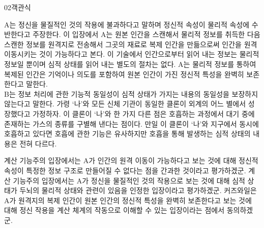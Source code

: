 \documentclass[fs85,seriesWit]{korfarm-base}
\begin{document}
\begin{kfQBlock}{02}{객관식}
\begin{kfEvidence}A는 정신을 물질적인 것의 작용에 불과하다고 말하며 정신적 속성이 물리적 속성에 수반한다고 주장한다. 이 입장에서 A는 원본 인간을 스캔해서 물리적 정보를 취득한 다음 스캔한 정보를 원격지로 전송해서 그곳의 재료로 복제 인간을 만듦으로써 인간을 원격 이동시키는 것이 가능하다고 본다. 이 기술에서 인간으로부터 읽어 내는 정보는 물리적 정보일 뿐이며 심적 상태를 읽어 내는 별도의 절차는 없다. A는 물리적 정보를 통하여 복제된 인간은 기억이나 의도를 포함하여 원본 인간이 가진 정신적 특성을 완벽히 보존한다고 말한다. \\\relax
B는 정보 처리에 관한 기능적 동일성이 심적 상태가 가지는 내용의 동일성을 보장하지 않는다고 말한다. 가령 ‘나’와 모든 신체 기관이 동일한 클론이 외계의 어느 별에서 성장했다고 가정하자. 이 클론이 ‘나’와 한 가지 다른 점은 호흡하는 과정에서 대기 중에 존재하는 가스의 종류를 구별해 낸다는 점이다. 만일 이 클론이 ‘나’와 지구에서 동시에 호흡하고 있다면 호흡에 관한 기능은 유사하지만 호흡을 통해 발생하는 심적 상태의 내용은 전혀 다르다.\end{kfEvidence}
\begin{kfChoices}
\kfChoice 계산 기능주의 입장에서는 A가 인간의 원격 이동이 가능하다고 보는 것에 대해 정신적 속성이 특정한 정보 구조로 만들어질 수 없다는 점을 간과한 것이라고 평가하겠군.
\kfChoice 계산 기능주의 입장에서는 A가 정신을 물질적인 것의 작용으로 보는 것에 대해 심적 상태가 두뇌의 물리적 상태와 관련이 있음을 인정한 입장이라고 평가하겠군.
\kfChoice 커즈와일은 A가 원격지의 복제 인간이 원본 인간의 정신적 특성을 완벽히 보존한다고 보는 것에 대해 정신 작용을 계산 체계의 작동으로 이해할 수 있는 입장이라는 점에서 동의하겠군.
\end{kfChoices}
\end{kfQBlock}
\end{document}
